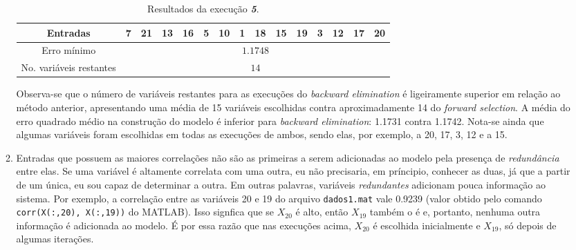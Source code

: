 \begin{enumerate}
\begin{enumerate}
\begin{table}[H]
\begin{tabular}{|c | c | c | c | c | c | c | c | c | c  | c | c | c | c | c
					| c | c | }
					\end{tabular}	    
			    \end{table}  	
			    
		\vspace{-12pt}

			\begin{table}[H]
				    \centering
				    \footnotesize
					\caption{\label{tab:backward5_sunspot} Resultados da execução
					\textit{\textbf{5}}.}
				    \vspace{-6pt}
					\begin{tabular}{|c | c | c | c | c | c | c | c | c | c | c | c | c | c | c|}
					\hline
					Entradas & 7 & 21 & 13 & 16 & 5 & 10 & 1 & 18 & 15 & 19 & 3 & 12 & 17 & 20   \\
					\hline
					Erro mínimo & \multicolumn{14}{c|}{\(1.1748\)}  \\ \hline
					No. variáveis restantes & \multicolumn{14}{c|}{\(14\)}  \\
					\hline
					
					\end{tabular}	    
			    \end{table}  	
	
			    \FloatBarrier	
	
		Observa-se que o número de variáveis restantes para as execuções do
		\textit{backward elimination} é ligeiramente superior em relação ao método
		anterior, apresentando uma média de 15 variáveis escolhidas contra
		aproximadamente 14 do \textit{forward selection}. A média do erro quadrado
		médio na construção do modelo é inferior para \textit{backward
		elimination}: 1.1731 contra 1.1742. Nota-se ainda que algumas variáveis foram
		escolhidas em todas as execuções de ambos, sendo elas, por exemplo, a 20, 17,
		3, 12 e a 15.
	
		 \item Entradas que possuem as maiores correlações não são as primeiras a
		 serem adicionadas ao modelo pela presença de \textit{redundância} entre elas.
		 Se uma variável é altamente correlata com uma outra, eu não precisaria, em
		 príncipio, conhecer as duas, já que a partir de um única, eu sou capaz de
		 determinar a outra. Em outras palavras, variáveis \textit{redundantes}
		 adicionam pouca informação ao sistema. Por exemplo, a correlação entre as
		 variáveis 20 e 19 do arquivo \texttt{dados1.mat} vale 0.9239 (valor obtido
		 pelo comando \texttt{corr(X(:,20), X(:,19))} do MATLAB). Isso signfica que se
		 \(X_{20}\) é alto, então \(X_{19}\) também o é e, portanto, nenhuma outra
		 informação é adicionada ao modelo. É por essa razão que nas execuções acima,	
		 \(X_{20}\) é escolhida inicialmente e \(X_{19}\), só depois de algumas
		 iterações.
		 

\end{enumerate}
\end{enumerate}
